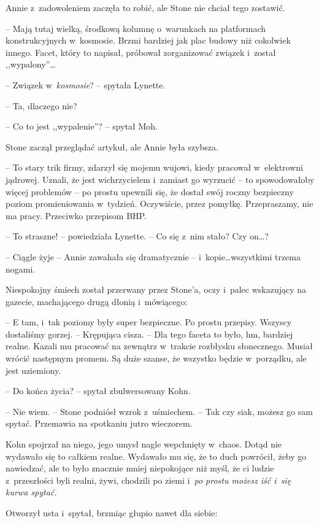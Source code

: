 \documentclass[oneside,polish,11pt,sfheadings]{mwbk}
\begin{document}
Annie z~zadowoleniem zaczęła to robić, ale Stone nie chciał tego
zostawić.

-- Mają tutaj wielką, środkową kolumnę o~warunkach na platformach
konstrukcyjnych w~kosmosie. Brzmi bardziej jak plac budowy niż cokolwiek
innego. Facet, który to napisał, próbował zorganizować związek i~został
,,wypalony''\ldots

-- Związek w~\emph{kosmosie}? -- spytała Lynette.

-- Ta, dlaczego nie?

-- Co to jest ,,wypalenie''? -- spytał Moh.

Stone zaczął przeglądać artykuł, ale Annie była szybsza.

-- To stary trik firmy, zdarzył się mojemu wujowi, kiedy pracował w~elektrowni jądrowej. Uznali, że jest wichrzycielem i~zamiast go wyrzucić
-- to spowodowałoby więcej problemów -- po prostu upewnili się, że dostał
swój roczny bezpieczny poziom promieniowania w~tydzień. Oczywiście,
przez pomyłkę. Przepraszamy, nie ma pracy. Przeciwko przepisom BHP.

-- To straszne! -- powiedziała Lynette. -- Co się z~nim stało? Czy on\ldots?

-- Ciągle żyje -- Annie zawahała się dramatycznie -- i~kopie\ldots wszystkimi
trzema nogami.

Niespokojny śmiech został przerwany przez Stone'a, oczy i~palec
wskazujący na gazecie, machającego drugą dłonią i~mówiącego: 

-- E tam, i~tak poziomy były super bezpieczne. Po prostu przepisy. Wszyscy
dostaliśmy gorzej. -- Krępująca cisza. -- Dla tego faceta to było, hm,
bardziej realne. Kazali mu pracować na zewnątrz w~trakcie rozbłysku
słonecznego. Musiał wrócić następnym promem. Są duże szanse, że wszystko
będzie w~porządku, ale jest uziemiony.

-- Do końca życia? -- spytał zbulwersowany Kohn.

-- Nie wiem. -- Stone podniósł wzrok z~uśmiechem. -- Tak czy siak, możesz
go sam spytać. Przemawia na spotkaniu jutro wieczorem.

Kohn spojrzał na niego, jego umysł nagle wepchnięty w~chaos. Dotąd nie
wydawało się to całkiem realne. Wydawało mu się, że to duch powrócił,
żeby go nawiedzać, ale to było znacznie mniej niepokojące niż myśl, że
ci ludzie z~przeszłości byli realni, żywi, chodzili po ziemi i~\emph{po
prostu możesz iść i~się kurwa spytać.}

Otworzył usta i~spytał, brzmiąc głupio nawet dla siebie: 
\end{document}
